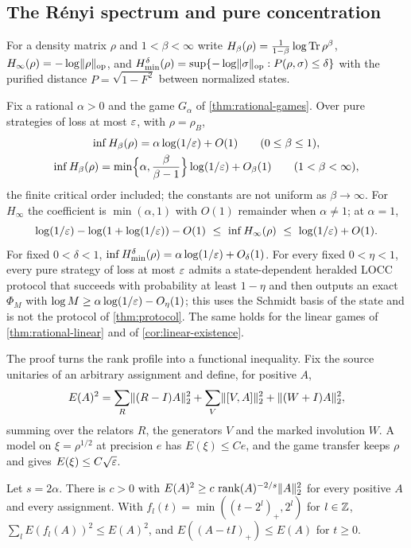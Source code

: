 \subsection{The R\'enyi spectrum and pure concentration}\label{sec:renyi}

For a density matrix $\rho$ and $1<\beta<\infty$ write $H_\beta(\rho)=\frac1{1-\beta}\log\operatorname{Tr}\rho^\beta$, $H_\infty(\rho)=-\log\lVert \rho\rVert_{\mathrm{op}}$, and
$H_{\min}^\delta(\rho)=\sup\{-\log\lVert \sigma\rVert_{\mathrm{op}}:P(\rho,\sigma)\le\delta\}$ with the purified distance $P=\sqrt{1-F^2}$ between normalized
states.

\begin{theorem}\label{thm:renyi}
Fix a rational $\alpha>0$ and the game $G_\alpha$ of \cref{thm:rational-games}. Over pure strategies of loss at most $\varepsilon$, with
$\rho=\rho_B$,
\begin{gather*}
\inf H_\beta(\rho)=\alpha\log(1/\varepsilon)+O(1)\qquad(0\le\beta\le1),\\
\inf H_\beta(\rho)=\min\Bigl\{\alpha,\frac\beta{\beta-1}\Bigr\}\log(1/\varepsilon)+O_\beta(1)\qquad(1<\beta<\infty),
\end{gather*}
the finite critical order included; the constants are not uniform as $\beta\to\infty$. For $H_\infty$ the coefficient is
$\min(\alpha,1)$ with $O(1)$ remainder when $\alpha\ne1$; at $\alpha=1$,
\[
\log(1/\eps)-\log(1+\log(1/\eps))-O(1)\ \le\ \inf H_\infty(\rho)\ \le\ \log(1/\eps)+O(1).
\]
For fixed $0<\delta<1$, $\inf H_{\min}^\delta(\rho)=\alpha\log(1/\varepsilon)+O_\delta(1)$. For every fixed $0<\eta<1$, every pure strategy of
loss at most $\varepsilon$ admits a state-dependent heralded LOCC protocol that succeeds with probability at least $1-\eta$ and then
outputs an exact $\Phi_M$ with $\log M\ge\alpha\log(1/\varepsilon)-O_\eta(1)$; this uses the Schmidt basis of the state and is not the
protocol of \cref{thm:protocol}. The same holds for the linear games of \cref{thm:rational-linear} and of
\cref{cor:linear-existence}.
\end{theorem}

The proof turns the rank profile into a functional inequality. Fix the source unitaries of an arbitrary assignment and define,
for positive $A$,
\[
E(A)^2=\sum_R\lVert (R-I)A\rVert_2^2+\sum_V\lVert [V,A]\rVert_2^2+\lVert (W+I)A\rVert_2^2,
\]
summing over the relators $R$, the generators $V$ and the marked involution $W$. A model on $\xi=\rho^{1/2}$ at precision $e$ has
$E(\xi)\le Ce$, and the game transfer keeps $\rho$ and gives $E(\xi)\le C\sqrt{\varepsilon}$.

\begin{lemma}\label{lem:faber-krahn}
Let $s=2\alpha$. There is $c>0$ with $E(A)^2\ge c\,\operatorname{rank}(A)^{-2/s}\lVert A\rVert_2^2$ for every positive $A$ and every assignment. With
$f_l(t)=\min((t-2^l)_+,2^l)$ for $l\in\mathbb Z$, $\sum_lE(f_l(A))^2\le E(A)^2$, and $E((A-tI)_+)\le E(A)$ for $t\ge0$.
\end{lemma}

